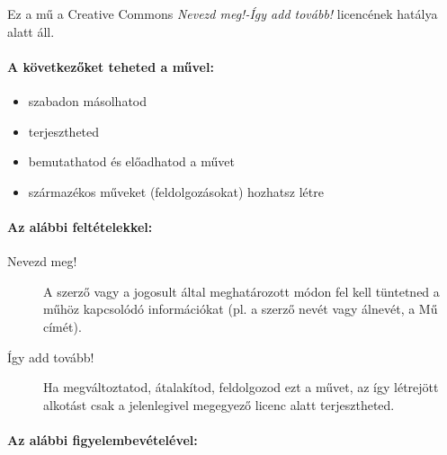 \documentclass[a4paper, titlepage]{report}
\begin{document}
Ez a mű a Creative Commons \textit{Nevezd meg!-Így add tovább!} licencének hatálya alatt áll.

\paragraph{A következőket teheted a művel:}

\begin{itemize}
 \item szabadon másolhatod
 \item terjesztheted
 \item bemutathatod és előadhatod a művet 
 \item származékos műveket (feldolgozásokat) hozhatsz létre
\end{itemize}

\paragraph{Az alábbi feltételekkel:}

\begin{description}
 \item[Nevezd meg!] A szerző vagy a jogosult által meghatározott módon fel kell tüntetned a műhöz kapcsolódó információkat (pl. a szerző nevét vagy álnevét, a Mű címét).
 \item[Így add tovább!] Ha megváltoztatod, átalakítod, feldolgozod ezt a művet, az így létrejött alkotást csak a jelenlegivel megegyező licenc alatt terjesztheted.
\end{description}

\paragraph{Az alábbi figyelembevételével:}
\end{document}
